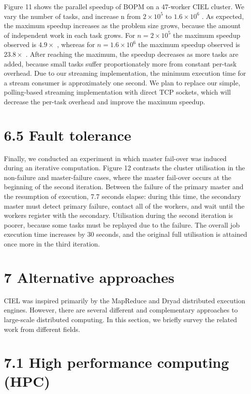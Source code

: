 \documentclass[
]{article}
\begin{document}
Figure 11 shows the parallel speedup of BOPM on a 47-worker CIEL
cluster. We vary the number of tasks, and increase n from
\(2 \times 10^{5}\) to \(1.6 \times 10^{6}\) . As expected, the maximum
speedup increases as the problem size grows, because the amount of
independent work in each task grows. For \(n = 2 \times 10^{5}\) the
maximum speedup observed is \(4.9 \times\) , whereas for
\(n = 1.6 \times 10^{6}\) the maximum speedup observed is
\(23.8 \times\) . After reaching the maximum, the speedup decreases as
more tasks are added, because small tasks suffer proportionately more
from constant per-task overhead. Due to our streaming implementation,
the minimum execution time for a stream consumer is approximately one
second. We plan to replace our simple, polling-based streaming
implementation with direct TCP sockets, which will decrease the per-task
overhead and improve the maximum speedup.

\section{6.5 Fault tolerance}\label{fault-tolerance-1}

Finally, we conducted an experiment in which master fail-over was
induced during an iterative computation. Figure 12 contrasts the cluster
utilisation in the non-failure and master-failure cases, where the
master fail-over occurs at the beginning of the second iteration.
Between the failure of the primary master and the resumption of
execution, 7.7 seconds elapse: during this time, the secondary master
must detect primary failure, contact all of the workers, and wait until
the workers register with the secondary. Utilisation during the second
iteration is poorer, because some tasks must be replayed due to the
failure. The overall job execution time increases by 30 seconds, and the
original full utilisation is attained once more in the third iteration.

\section{7 Alternative approaches}\label{alternative-approaches}

CIEL was inspired primarily by the MapReduce and Dryad distributed
execution engines. However, there are several different and
complementary approaches to large-scale distributed computing. In this
section, we briefly survey the related work from different fields.

\section{7.1 High performance computing
(HPC)}\label{high-performance-computing-hpc}
\end{document}
